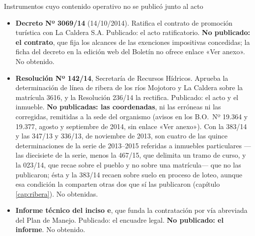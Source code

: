 \begin{ficha}{Instrumentos cuyo contenido operativo no se publicó junto al acto}
\begin{itemize}[leftmargin=*,nosep]
\item \textbf{Decreto Nº 3069/14} (14/10/2014). Ratifica el contrato de promoción turística con La Caldera S.A. Publicado: el acto ratificatorio. \textbf{No publicado: el contrato}, que fija los alcances de las exenciones impositivas concedidas; la ficha del decreto en la edición web del Boletín no ofrece enlace «Ver anexo». No obtenido.
\item \textbf{Resolución Nº 142/14}, Secretaría de Recursos Hídricos. Aprueba la determinación de línea de ribera de los ríos Mojotoro y La Caldera sobre la matrícula 3616, y la Resolución 236/14 la rectifica. Publicado: el acto y el inmueble. \textbf{No publicadas: las coordenadas}, ni las erróneas ni las corregidas, remitidas a la sede del organismo (avisos en los B.O.\ Nº 19.364 y 19.377, agosto y septiembre de 2014, sin enlace «Ver anexo»). Con la 383/14 y las 347/13 y 336/13, de noviembre de 2013, son cuatro de las quince determinaciones de la serie de 2013--2015 referidas a inmuebles particulares ---las diecisiete de la serie, menos la 467/15, que delimita un tramo de curso, y la 023/14, que recae sobre el pueblo y no sobre una matrícula--- que no las publicaron; ésta y la 383/14 recaen sobre suelo en proceso de loteo, aunque esa condición la comparten otras dos que sí las publicaron (capítulo \ref{cap:ribera}). No obtenidas.
\item \textbf{Informe técnico del inciso e}, que funda la contratación por vía abreviada del Plan de Manejo. Publicado: el encuadre legal. \textbf{No publicado: el informe}. No obtenido.
\end{itemize}
\end{ficha}

